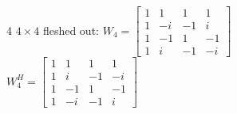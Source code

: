 \documentclass[9pt]{extarticle}
\begin{document}
\begin{multicols*}{4}
\vspace{1em}
$4\times 4$ fleshed out: $W_{4}=\begin{bmatrix}1&1&1&1\\ 1&-i&-1&i\\ 1&-1&1&-1\\ 1&i&-1&-i\end{bmatrix}$\\
$W_4^H = \begin{bmatrix} 1 & 1 & 1 & 1 \\ 1 & i & -1 & -i \\ 1 & -1 & 1 & -1 \\ 1 & -i & -1 & i \end{bmatrix}$



\end{multicols*}
\end{document}
